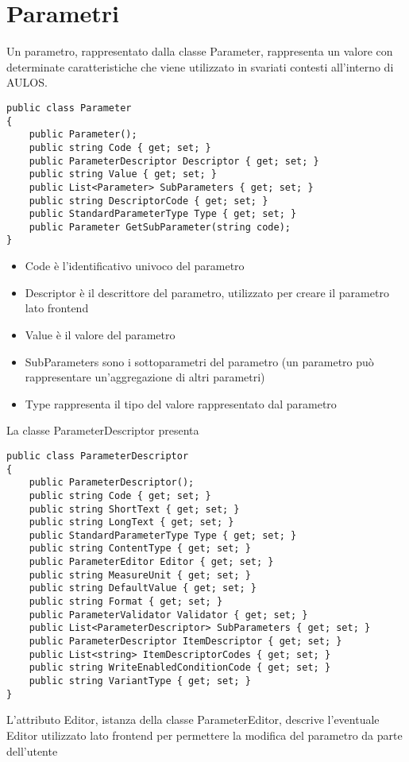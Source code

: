 \section{Parametri}

Un parametro, rappresentato dalla classe Parameter, rappresenta un valore con determinate caratteristiche che viene utilizzato in svariati contesti all'interno di AULOS.
\begin{lstlisting}[caption={Parameter.cs},style=sharpCode]
public class Parameter
{
    public Parameter();
    public string Code { get; set; }
    public ParameterDescriptor Descriptor { get; set; }
    public string Value { get; set; }
    public List<Parameter> SubParameters { get; set; }
    public string DescriptorCode { get; set; }
    public StandardParameterType Type { get; set; }
    public Parameter GetSubParameter(string code);
}
\end{lstlisting}
\begin{itemize}
\item Code è l'identificativo univoco del parametro
\item Descriptor è il descrittore del parametro, utilizzato per creare il parametro lato frontend
\item Value è il valore del parametro
\item SubParameters sono i sottoparametri del parametro (un parametro può rappresentare un'aggregazione di altri parametri)
\item Type rappresenta il tipo del valore rappresentato dal parametro
\end{itemize}
La classe ParameterDescriptor presenta
\begin{lstlisting}[caption={ParameterDescriptor.cs},style=sharpCode]
public class ParameterDescriptor
{
    public ParameterDescriptor();        
    public string Code { get; set; }
    public string ShortText { get; set; }
    public string LongText { get; set; }
    public StandardParameterType Type { get; set; }
    public string ContentType { get; set; }
    public ParameterEditor Editor { get; set; }
    public string MeasureUnit { get; set; }
    public string DefaultValue { get; set; }
    public string Format { get; set; }
    public ParameterValidator Validator { get; set; }
    public List<ParameterDescriptor> SubParameters { get; set; }
    public ParameterDescriptor ItemDescriptor { get; set; }
    public List<string> ItemDescriptorCodes { get; set; }
    public string WriteEnabledConditionCode { get; set; }
    public string VariantType { get; set; }
}
\end{lstlisting}
L'attributo Editor, istanza della classe ParameterEditor, descrive l'eventuale Editor utilizzato lato frontend per permettere la modifica del parametro da parte dell'utente

